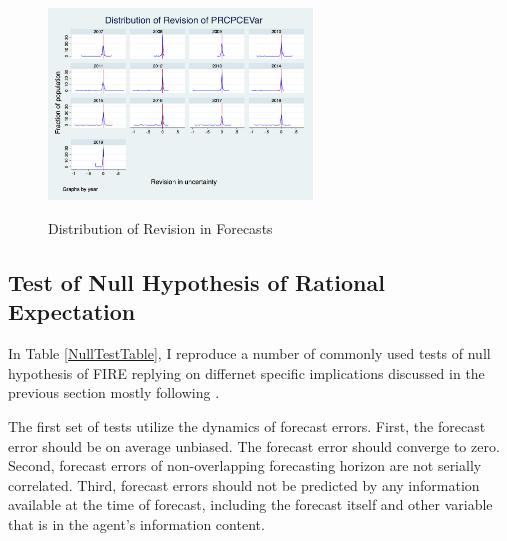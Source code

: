 \documentclass[]{article}
\begin{document}
\begin{figure}[ht]
	\includegraphics[width=7cm]{figures/PRCPCEVar_rv_hist.png}  \\
	\caption{Distribution of Revision in Forecasts}
	\label{RevisionHist}
\end{figure}



\subsection{Test of Null Hypothesis of Rational Expectation}

In Table \ref{NullTestTable}, I reproduce a number of commonly used tests of null hypothesis of FIRE replying on differnet specific implications discussed in the previous section mostly following \citet{mankiw2003disagreement}. 

The first set of tests utilize the dynamics of forecast errors. First, the forecast error should be on average unbiased. The forecast error should converge to zero. Second, forecast errors of non-overlapping forecasting horizon are not serially correlated.  Third, forecast errors should not be predicted by any information available at the time of forecast, including the forecast itself and other variable that is in the agent's information content. 
\end{document}
